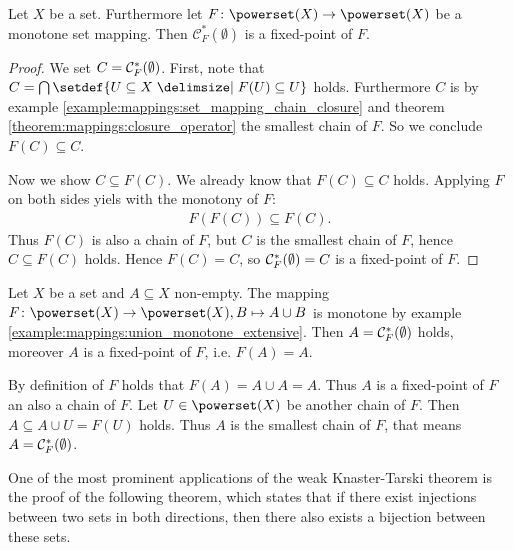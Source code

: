 \begin{theorem}\label{theorem:mappings:weak_knaster_tarski}
    Let $X$ be a set. Furthermore let $F\colon\powerset(X)\rightarrow\powerset(X)$ be a monotone set mapping. Then $\mathcal C^*_F(\emptyset)$ is a fixed-point of $F$.
\end{theorem}

\begin{proof}
    We set $C=\mathcal C^*_F(\emptyset)$. First, note that $C=\bigcap\setdef{U\subseteq X\given F(U)\subseteq U}$ holds. Furthermore $C$ is by example \ref{example:mappings:set_mapping_chain_closure} and theorem \ref{theorem:mappings:closure_operator} the smallest chain of $F$. So we conclude $F(C)\subseteq C$.

    Now we show $C\subseteq F(C)$. We already know that $F(C)\subseteq C$ holds. Applying $F$ on both sides yiels with the monotony of $F$:
    \begin{align}F(F(C))\subseteq F(C).\end{align}
    Thus $F(C)$ is also a chain of $F$, but $C$ is the smallest chain of $F$, hence $C\subseteq F(C)$ holds. Hence $F(C)=C$, so $\mathcal C^*_F(\emptyset)=C$ is a fixed-point of $F$.
\end{proof}

\begin{examples}
    \begin{exampleenumerate}
        \item Let $X$ be a set and $A\subseteq X$ non-empty. The mapping $F\colon\powerset(X)\rightarrow\powerset(X),B\mapsto A\cup B$ is monotone by example \ref{example:mappings:union_monotone_extensive}. Then $A=\mathcal C^*_F(\emptyset)$ holds, moreover $A$ is a fixed-point of $F$, i.e. $F(A)=A$.
        \begin{miniproof}
            By definition of $F$ holds that $F(A)=A\cup A=A$. Thus $A$ is a fixed-point of $F$ an also a chain of $F$. Let $U\in\powerset(X)$ be another chain of $F$. Then $A\subseteq A\cup U=F(U)$ holds. Thus $A$ is the smallest chain of $F$, that means $A=\mathcal C^*_F(\emptyset)$.
        \end{miniproof}
    \end{exampleenumerate}
\end{examples}

One of the most prominent applications of the weak Knaster-Tarski theorem is the proof of the following theorem, which states that if there exist injections between two sets in both directions, then there also exists a bijection between these sets.

